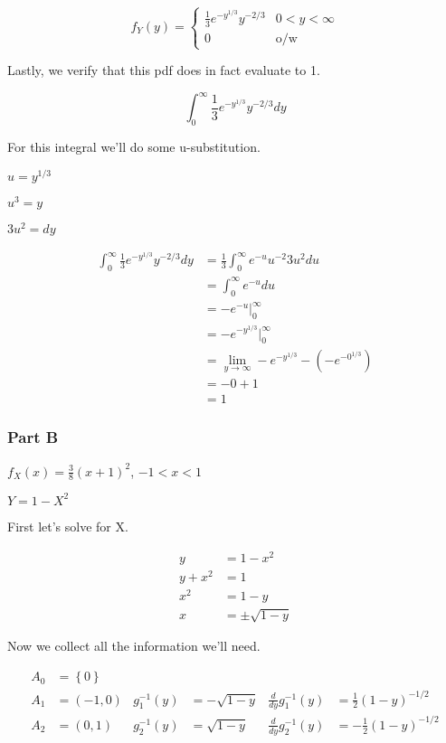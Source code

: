 \[
	f_Y(y) = \begin{cases}
		 \frac{1}{3} e^{-y^{1/3}}y^{-2/3} & 0 < y < \infty \\
		 0 & \text{o/w}
	\end{cases}
\]

Lastly, we verify that this pdf does in fact evaluate to 1.

\[\int_{0}^{\infty} \frac{1}{3} e^{-y^{1/3}}y^{-2/3} dy\]

For this integral we'll do some u-substitution. 

$u=y^{1/3}$

$u^3 = y$

$3u^2 = dy$

\begin{align*}
	\int_{0}^{\infty} \frac{1}{3} e^{-y^{1/3}}y^{-2/3} dy &= \frac{1}{3} \int_{0}^{\infty} e^{-u} u^{-2} 3u^{2} du \\
	&= \int_{0}^{\infty} e^{-u} du \\
	&= -e^{-u} \rvert^{\infty}_0 \\
	&= -e^{-y^{1/3}} \rvert^{\infty}_0 \\	
	&= \lim_{y \to \infty} -e^{-y^{1/3}} - (-e^{-0^{1/3}}) \\
	&= -0 + 1 \\
	&= 1
\end{align*}

\pagebreak

\subsubsection*{Part B}

$f_X(x) = \frac{3}{8}(x+1)^2$, $-1 < x < 1$

\noindent $Y = 1 - X^2$

First let's solve for X.

\begin{align*}
	y &= 1 - x^2 \\
	y + x^2 &= 1 \\
	x^2 &= 1 - y \\
	x &= \pm \sqrt{1-y}
\end{align*}

Now we collect all the information we'll need.

\begin{align*}
	A_0 &= \left\{ 0 \right\} \\
	A_1 &= (-1, 0) & g_1^{-1}(y) &= -\sqrt{1-y} & \frac{d}{dy}g_1^{-1}(y) &= \frac{1}{2}(1-y)^{-1/2}\\
	A_2 &= (0, 1)  & g_2^{-1}(y) &= \sqrt{1-y} & \frac{d}{dy}g_2^{-1}(y) &= -\frac{1}{2}(1-y)^{-1/2}
\end{align*}

